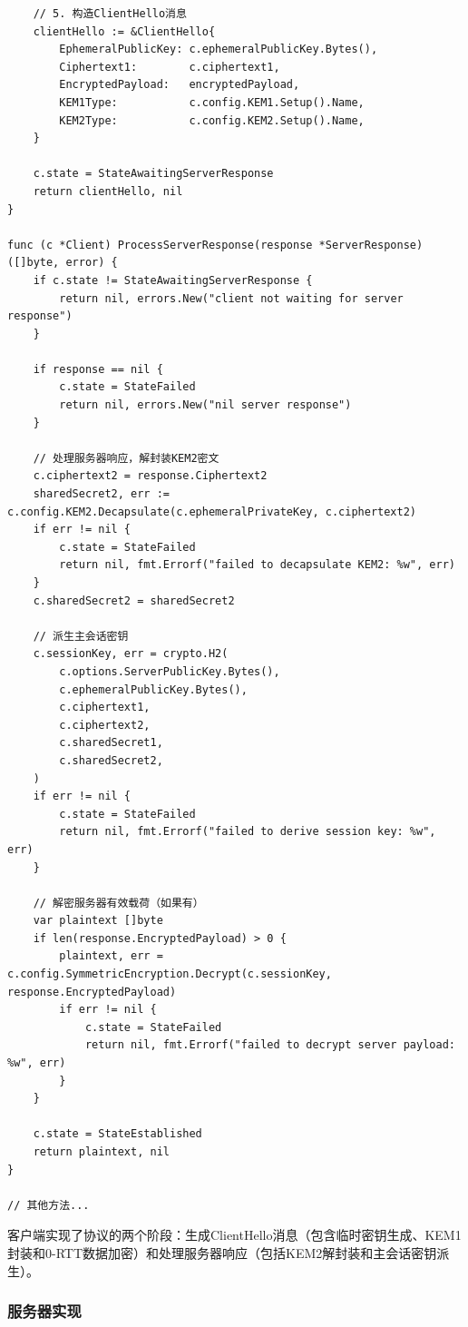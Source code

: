 \begin{verbatim}
    // 5. 构造ClientHello消息
    clientHello := &ClientHello{
        EphemeralPublicKey: c.ephemeralPublicKey.Bytes(),
        Ciphertext1:        c.ciphertext1,
        EncryptedPayload:   encryptedPayload,
        KEM1Type:           c.config.KEM1.Setup().Name,
        KEM2Type:           c.config.KEM2.Setup().Name,
    }

    c.state = StateAwaitingServerResponse
    return clientHello, nil
}

func (c *Client) ProcessServerResponse(response *ServerResponse) ([]byte, error) {
    if c.state != StateAwaitingServerResponse {
        return nil, errors.New("client not waiting for server response")
    }

    if response == nil {
        c.state = StateFailed
        return nil, errors.New("nil server response")
    }

    // 处理服务器响应，解封装KEM2密文
    c.ciphertext2 = response.Ciphertext2
    sharedSecret2, err := c.config.KEM2.Decapsulate(c.ephemeralPrivateKey, c.ciphertext2)
    if err != nil {
        c.state = StateFailed
        return nil, fmt.Errorf("failed to decapsulate KEM2: %w", err)
    }
    c.sharedSecret2 = sharedSecret2

    // 派生主会话密钥
    c.sessionKey, err = crypto.H2(
        c.options.ServerPublicKey.Bytes(),
        c.ephemeralPublicKey.Bytes(),
        c.ciphertext1,
        c.ciphertext2,
        c.sharedSecret1,
        c.sharedSecret2,
    )
    if err != nil {
        c.state = StateFailed
        return nil, fmt.Errorf("failed to derive session key: %w", err)
    }

    // 解密服务器有效载荷（如果有）
    var plaintext []byte
    if len(response.EncryptedPayload) > 0 {
        plaintext, err = c.config.SymmetricEncryption.Decrypt(c.sessionKey, response.EncryptedPayload)
        if err != nil {
            c.state = StateFailed
            return nil, fmt.Errorf("failed to decrypt server payload: %w", err)
        }
    }

    c.state = StateEstablished
    return plaintext, nil
}

// 其他方法...
\end{verbatim}

客户端实现了协议的两个阶段：生成ClientHello消息（包含临时密钥生成、KEM1封装和0-RTT数据加密）和处理服务器响应（包括KEM2解封装和主会话密钥派生）。

\subsubsection{服务器实现}

